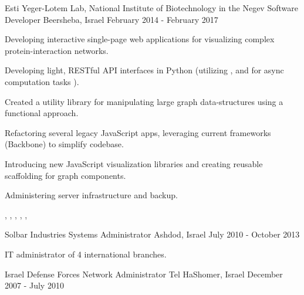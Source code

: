\begin{cventries}
  \cventry
    {Esti Yeger-Lotem Lab, National Institute of Biotechnology in the Negev}
    {Software Developer}
    {Beersheba, Israel}
    {February 2014 - February 2017}
    {
      \begin{cvitems}
        \item {Developing interactive single-page web applications for visualizing complex protein-interaction networks.}
        \item {Developing light, RESTful API interfaces in Python (utilizing , and  for async computation tasks ).}
        \item {Created a utility library for manipulating large graph data-structures using a functional approach.}
        \item {Refactoring several legacy JavaScript apps, leveraging current frameworks (Backbone) to simplify codebase.}
        \item {Introducing new JavaScript visualization libraries and creating reusable scaffolding for graph components.}
        \item {Administering server infrastructure and backup.}
      \end{cvitems}
    }
    
    \begin{cvskills}
       {, }
       {, ,  , , }
    \end{cvskills}
    
  \cventry
    {Solbar Industries}
    {Systems Administrator}
    {Ashdod, Israel}
    {July 2010 - October 2013}
    {
      \begin{cvitems}
        \item {IT administrator of 4 international branches.}
      \end{cvitems}
    }
    \vspace{3.0mm}

  \cventry
    {Israel Defense Forces}
    {Network Administrator}
    {Tel HaShomer, Israel}
    {December 2007 - July 2010}
    {}
    \vspace{-5.0mm}

\end{cventries}

